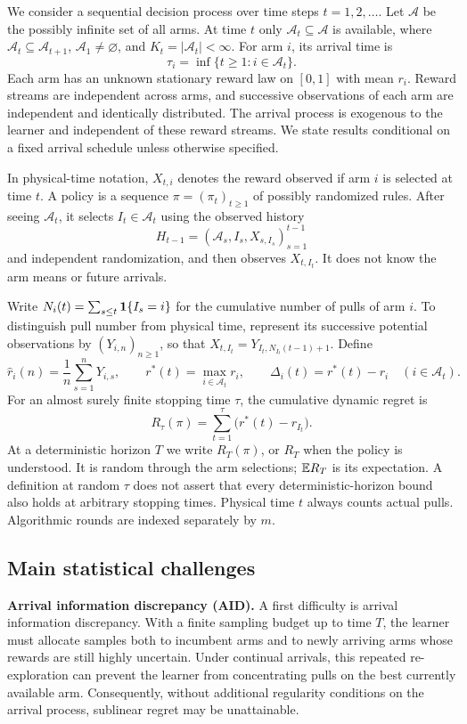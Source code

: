 \documentclass[11pt]{article}
\begin{document}
We consider a sequential decision process over time steps $t=1,2,\ldots$.
Let $\mathcal A$ be the possibly infinite set of all arms. At time $t$ only
$\mathcal A_t\subseteq\mathcal A$ is available, where
$\mathcal A_t\subseteq\mathcal A_{t+1}$,
$\mathcal A_1\ne\varnothing$, and $K_t=|\mathcal A_t|<\infty$.
For arm $i$, its arrival time is
\[
 \tau_i=\inf\{t\ge1:i\in\mathcal A_t\}.
\]
Each arm has an unknown stationary reward law on $[0,1]$ with mean $r_i$.
Reward streams are independent across arms, and successive observations of
each arm are independent and identically distributed. The arrival process is
exogenous to the learner and independent of these reward streams. We state
results conditional on a fixed arrival schedule unless otherwise specified.

In physical-time notation, $X_{t,i}$ denotes the reward observed if arm
$i$ is selected at time $t$. A policy is a sequence
$\pi=(\pi_t)_{t\ge1}$ of possibly randomized rules. After seeing
$\mathcal A_t$, it selects $I_t\in\mathcal A_t$ using the observed history
\[
 H_{t-1}=(\mathcal A_s,I_s,X_{s,I_s})_{s=1}^{t-1}
\]
and independent randomization, and then observes $X_{t,I_t}$.
It does not know the arm means or future arrivals.

Write $N_i(t)=\sum_{s\le t}\mathbf 1\{I_s=i\}$ for the cumulative number of pulls
of arm $i$. To distinguish pull number from physical time, represent its
successive potential observations by $(Y_{i,n})_{n\ge1}$, so that
$X_{t,I_t}=Y_{I_t,N_{I_t}(t-1)+1}$. Define
\[
 \hat r_i(n)=\frac1n\sum_{s=1}^nY_{i,s},\qquad
 r^*(t)=\max_{i\in\mathcal A_t}r_i,\qquad
 \Delta_i(t)=r^*(t)-r_i\quad(i\in\mathcal A_t).
\]
For an almost surely finite stopping time $\tau$, the cumulative dynamic regret is
\[
 R_\tau(\pi)=\sum_{t=1}^{\tau}\bigl(r^*(t)-r_{I_t}\bigr).
\]
At a deterministic horizon $T$ we write $R_T(\pi)$, or $R_T$ when the policy
is understood. It is random through the arm selections; $\mathbb E R_T$ is its
expectation. A definition at random $\tau$ does not assert that every
deterministic-horizon bound also holds at arbitrary stopping times.
Physical time $t$ always counts actual pulls. Algorithmic rounds are indexed
separately by $m$.

\subsection{Main statistical challenges}

\textbf{Arrival information discrepancy (AID).}
A first difficulty is arrival information discrepancy. With a finite sampling budget up to time $T$, the learner must allocate samples both to incumbent arms and to newly arriving arms whose rewards are still highly uncertain. Under continual arrivals, this repeated re-exploration can prevent the learner from concentrating pulls on the best currently available arm. Consequently, without additional regularity conditions on the arrival process, sublinear regret may be unattainable.
\end{document}
